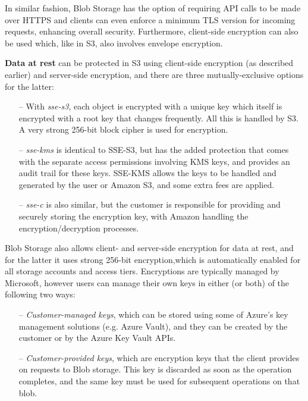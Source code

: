In similar fashion, Blob Storage has the option of requiring API calls to be made over HTTPS and clients can even enforce a minimum TLS version for incoming requests, enhancing overall security. Furthermore, client-side encryption can also be used which, like in S3, also involves envelope encryption.~\cite{blob_minimum_tls,blob_clientside,azure_vault,blob_secure_transfer}


\textbf{Data at rest} can be protected in S3 using client-side encryption (as described earlier) and server-side encryption, and there are three mutually-exclusive options for the latter: ~\cite{s3serverside}

\begin{itemize}
    \item [--] With \textit{\ac{sse-s3}}, each object is encrypted with a unique key which itself is encrypted with a root key that changes frequently. All this is handled by S3. A very strong 256-bit block cipher is used for encryption.

    \item [--] \textit{\ac{sse-kms}} is identical to SSE-S3, but has the added protection that comes with the separate access permissions involving KMS keys, and provides an audit trail for these keys. SSE-KMS allows the keys to be handled and generated by the user or Amazon S3, and some extra fees are applied.

    \item [--] \textit{\ac{sse-c}} is also similar, but the customer is responsible for providing and securely storing the encryption key, with Amazon handling the encryption/decryption processes.
\end{itemize}

Blob Storage also allows client- and server-side encryption for data at rest, and for the latter it uses strong 256-bit encryption,which is automatically enabled for all storage accounts and access tiers. Encryptions are typically managed by Microsoft, however users can manage their own keys in either (or both) of the following two ways: ~\cite{blob_at_rest,blob_keys1,blob_keys2}

\begin{itemize}
    \item [--] \textit{Customer-managed keys}, which can be stored using some of Azure's key management solutions (e.g. Azure Vault), and they can be created by the customer or by the Azure Key Vault APIs.

    \item [--] \textit{Customer-provided keys}, which are encryption keys that the client provides on requests to Blob storage. This key is discarded as soon as the operation completes, and the same key must be used for subsequent operations on that blob.
\end{itemize}

